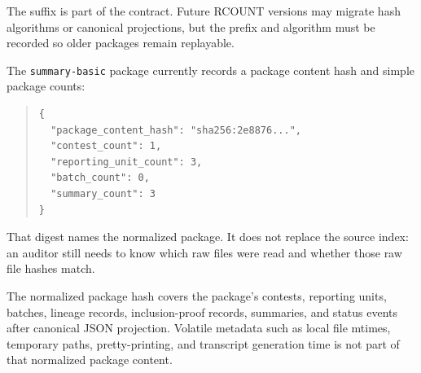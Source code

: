 The suffix is part of the contract. Future RCOUNT versions may migrate hash
algorithms or canonical projections, but the prefix and algorithm must be
recorded so older packages remain replayable.

The \texttt{summary-basic} package currently records a package content hash and
simple package counts:
\begin{quote}
\footnotesize
\begin{verbatim}
{
  "package_content_hash": "sha256:2e8876...",
  "contest_count": 1,
  "reporting_unit_count": 3,
  "batch_count": 0,
  "summary_count": 3
}
\end{verbatim}
\end{quote}

That digest names the normalized package. It does not replace the source index:
an auditor still needs to know which raw files were read and whether those raw
file hashes match.

The normalized package hash covers the package's contests, reporting units,
batches, lineage records, inclusion-proof records, summaries, and status events
after canonical JSON projection. Volatile metadata such as local file mtimes,
temporary paths, pretty-printing, and transcript generation time is not part of
that normalized package content.
